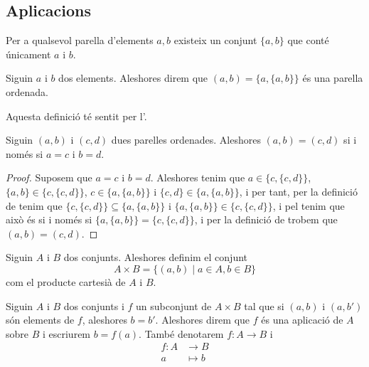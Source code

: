 \documentclass[../Apunts.tex]{subfiles}
\begin{document}
	\subsection{Aplicacions}
	\begin{axiom}
		\label{axiom:axioma del parell}
		Per a qualsevol parella d'elements \(a,b\) existeix un conjunt \(\{a,b\}\) que conté únicament \(a\) i \(b\).
	\end{axiom}
	\begin{definition}
		\label{def:parelles ordenades}
		Siguin \(a\) i \(b\) dos elements. Aleshores direm que \((a,b)=\{a,\{a,b\}\}\) és una parella ordenada.
		
		Aquesta definició té sentit per l'.
	\end{definition}
	\begin{proposition}
		\label{prop:parelles ordenades}
		Siguin \((a,b)\) i \((c,d)\) dues parelles ordenades. Aleshores \((a,b)=(c,d)\) si i només si \(a=c\) i \(b=d\).
		\begin{proof}
			Suposem que \(a=c\) i \(b=d\). Aleshores tenim que \(a\in\{c,\{c,d\}\}\), \(\{a,b\}\in\{c,\{c,d\}\}\), \(c\in\{a,\{a,b\}\}\) i \(\{c,d\}\in\{a,\{a,b\}\}\), i per tant, per la definició de  tenim que \(\{c,\{c,d\}\}\subseteq\{a,\{a,b\}\}\) i \(\{a,\{a,b\}\}\in\{c,\{c,d\}\}\), i pel  tenim que això és si i només si \(\{a,\{a,b\}\}=\{c,\{c,d\}\}\), i per la definició de  trobem que \((a,b)=(c,d)\).
		\end{proof}
	\end{proposition}
	\begin{definition}
		\label{def:producte cartesià de conjunts}
		Siguin \(A\) i \(B\) dos conjunts. Aleshores definim el conjunt
		\[A\times B=\{(a,b)\mid a\in A,b\in B\}\]
		com el producte cartesià de \(A\) i \(B\).
	\end{definition}
	\begin{definition}[Aplicació]
		\label{def:aplicació}
		Siguin \(A\) i \(B\) dos conjunts i \(f\) un subconjunt de \(A\times B\) tal que si \((a,b)\) i \((a,b')\) són elements de \(f\), aleshores \(b=b'\). Aleshores direm que \(f\) és una aplicació de \(A\) sobre \(B\) i escriurem \(b=f(a)\). També denotarem \(f\colon A\longrightarrow B\) i
		\begin{align*}
		f\colon A&\longrightarrow B\\
		a&\longmapsto b
		\end{align*}
	\end{definition}
\end{document}
